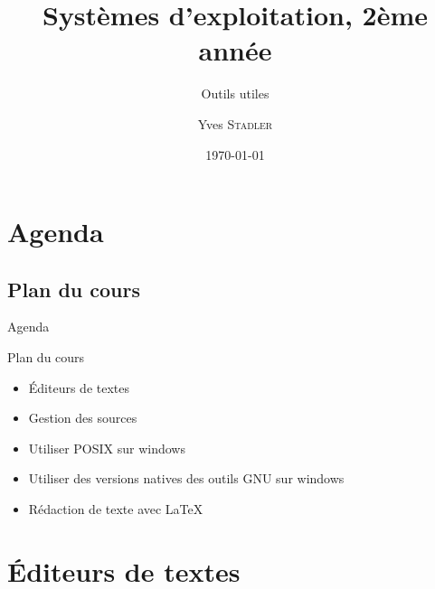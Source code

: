 
\title{Systèmes d'exploitation, 2ème année}
\subtitle{Outils utiles}

\author{Yves \textsc{Stadler}}

\date{\today}




\begin{frame}
\titlepage
\end{frame}

\def\sectitle{Agenda}
\section{\sectitle}
\def\subsectitle{Plan du cours}
\subsection{\subsectitle}

\begin{frame}{\sectitle}
\begin{block}{\subsectitle}
\begin{itemize}
    \item Éditeurs de textes
    \item Gestion des sources
    \item Utiliser POSIX sur windows
    \item Utiliser des versions natives des outils GNU sur windows
    \item Rédaction de texte avec \LaTeX
\end{itemize}
\end{block}
\end{frame}

\def\sectitle{Éditeurs de textes}
\section{\sectitle}
\def\subsectitle{Liste}
